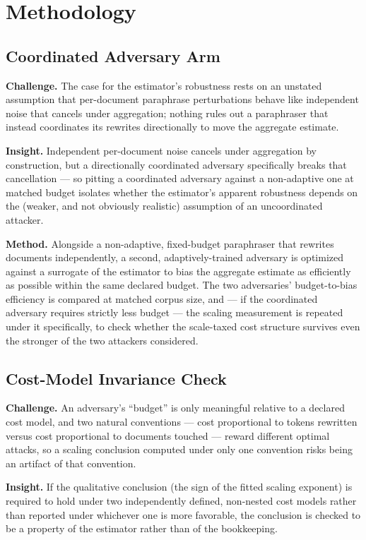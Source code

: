 \documentclass[11pt]{article}
\begin{document}
\section{Methodology}

\subsection{Coordinated Adversary Arm}
\textbf{Challenge.} The case for the estimator's robustness rests on an unstated assumption that per-document paraphrase perturbations behave like independent noise that cancels under aggregation; nothing rules out a paraphraser that instead coordinates its rewrites directionally to move the aggregate estimate.

\textbf{Insight.} Independent per-document noise cancels under aggregation by construction, but a directionally coordinated adversary specifically breaks that cancellation --- so pitting a coordinated adversary against a non-adaptive one at matched budget isolates whether the estimator's apparent robustness depends on the (weaker, and not obviously realistic) assumption of an uncoordinated attacker.

\textbf{Method.} Alongside a non-adaptive, fixed-budget paraphraser that rewrites documents independently, a second, adaptively-trained adversary is optimized against a surrogate of the estimator to bias the aggregate estimate as efficiently as possible within the same declared budget. The two adversaries' budget-to-bias efficiency is compared at matched corpus size, and --- if the coordinated adversary requires strictly less budget --- the scaling measurement is repeated under it specifically, to check whether the scale-taxed cost structure survives even the stronger of the two attackers considered.

\subsection{Cost-Model Invariance Check}
\textbf{Challenge.} An adversary's ``budget'' is only meaningful relative to a declared cost model, and two natural conventions --- cost proportional to tokens rewritten versus cost proportional to documents touched --- reward different optimal attacks, so a scaling conclusion computed under only one convention risks being an artifact of that convention.

\textbf{Insight.} If the qualitative conclusion (the sign of the fitted scaling exponent) is required to hold under two independently defined, non-nested cost models rather than reported under whichever one is more favorable, the conclusion is checked to be a property of the estimator rather than of the bookkeeping.
\end{document}
